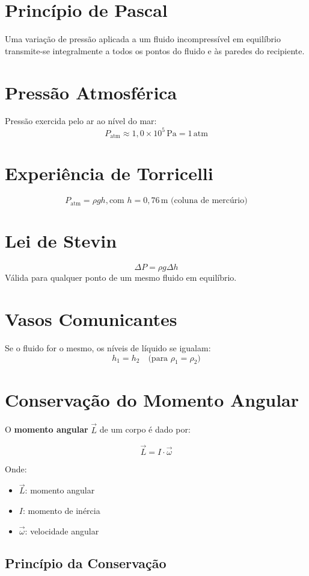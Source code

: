 \documentclass[a4paper,12pt]{article}
\begin{document}
\begin{multicols}{2}
\section{Princípio de Pascal}
Uma variação de pressão aplicada a um fluido incompressível em equilíbrio transmite-se integralmente a todos os pontos do fluido e às paredes do recipiente.

\section{Pressão Atmosférica}
Pressão exercida pelo ar ao nível do mar:
\[
P_{\text{atm}} \approx 1{,}0 \times 10^5\, \text{Pa} = 1\, \text{atm}
\]

\section{Experiência de Torricelli}
\[
P_{\text{atm}} = \rho g h, \text{com } h = 0{,}76\, \text{m (coluna de mercúrio)}
\]

\section{Lei de Stevin}
\[
\Delta P = \rho g \Delta h
\]
Válida para qualquer ponto de um mesmo fluido em equilíbrio.

\section{Vasos Comunicantes}
Se o fluido for o mesmo, os níveis de líquido se igualam:
\[
h_1 = h_2
\quad \text{(para } \rho_1 = \rho_2)
\]

\section{Conservação do Momento Angular}

O \textbf{momento angular} \( \vec{L} \) de um corpo é dado por:

\[
\vec{L} = I \cdot \vec{\omega}
\]

Onde:
\begin{itemize}
  \item \( \vec{L} \): momento angular
  \item \( I \): momento de inércia
  \item \( \vec{\omega} \): velocidade angular
\end{itemize}

\subsection{Princípio da Conservação}


\end{multicols}
\end{document}
